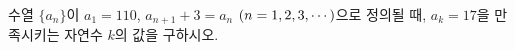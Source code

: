 \hspace*{2mm}\begin{minipage}[t]{\dimexpr\linewidth-2mm\relax}\vspace{0pt}
수열 $\{a_n\}$이 $a_1=110$, $a_{n+1}+3=a_n$ $(n=1{,}\mkern3mu\mathopen{}2{,}\mkern3mu\mathopen{}3{,}\mkern3mu\mathopen{}\cdots)$으로 정의될 때, $a_k=17$을 만족시키는 자연수 $k$의 값을 구하시오.\end{minipage}
